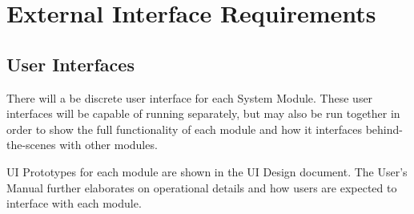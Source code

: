 \documentclass{scrreprt}
\begin{document}
\chapter{External Interface Requirements}

\section{User Interfaces}
There will a be discrete user interface for each System Module. These user
interfaces will be capable of running separately, but may also be run together
in order to show the full functionality of each module and how it interfaces
behind-the-scenes with other modules.

UI Prototypes for each module are shown in the UI Design document. The User's
Manual further elaborates on operational details and how users are expected to
interface with each module.


%



\end{document}
